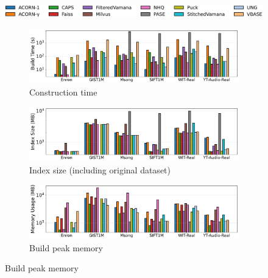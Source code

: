 \documentclass[sigconf, nonacm]{acmart}
\begin{document}
	\begin{figure}[t]
		\centering
		
		
		\hspace*{10pt} %
		\includegraphics[width=0.95\columnwidth]{figures/indexData/legend_only.pdf} %
		
		
		\begin{subfigure}{\columnwidth}
			\centering
			
			\includegraphics[width=0.95\linewidth]{figures/indexData/exp_7_build_time_comparison_query1.pdf}
			\caption{Construction time}
			\label{fig:build_time_comparison_query1}
		\end{subfigure}
		
		
		
		\begin{subfigure}{\columnwidth}
			\centering
			
			\includegraphics[width=0.95\linewidth]{figures/indexData/exp_7_index_size_mb_comparison_query1.pdf}
			\caption{Index size (including original dataset)}
			\label{fig:index_size_mb_comparison_query1}
		\end{subfigure}
		
		
		
		\begin{subfigure}{\columnwidth}
			\centering
			
			\includegraphics[width=0.95\linewidth]{figures/indexData/exp_7_memory_mb_comparison_query1.pdf}
			\caption{Build peak memory }
			\label{fig:build_memory_mb_comparison}
		\end{subfigure}
		

\end{figure}
\end{document}
